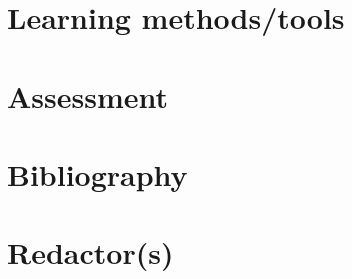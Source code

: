 \documentclass[hy]{esisyllabus}
\begin{document}
	\practicals
	
	\section{Learning methods/tools}
	
	\methods
	
	\section{Assessment}
	
	\assessment

	\section{Bibliography}
	
	
	\nocite{*}
	\renewcommand{\bibsection}{}
	
	
	
	\section{Redactor(s)}
	
	\redactors
	
	\reviewers
	
\end{document}
